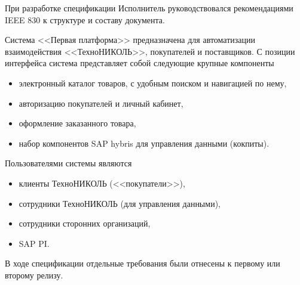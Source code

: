 

%



При разработке спецификации Исполнитель руководствовался рекомендациями IEEE 830 к структуре и составу документа.


Система <<Первая платформа>> предназначена для автоматизации взаимодействия <<ТехноНИКОЛЬ>>, покупателей и поставщиков. С позиции интерфейса система представляет собой следующие крупные компоненты 
\begin{itemize}
\item электронный каталог товаров, с удобным поиском и навигацией по нему,
\item авторизацию покупателей и личный кабинет,
\item оформление заказанного товара,
\item набор компонентов SAP hybris для управления данными (кокпиты).
\end{itemize}


Пользователями системы являются 
\begin{itemize}
\item клиенты ТехноНИКОЛЬ (<<покупатели>>), 
\item сотрудники ТехноНИКОЛЬ (для управления данными),
\item сотрудники сторонних организаций,
\item SAP PI.
\end{itemize}


В ходе спецификации отдельные требования были отнесены к первому или второму релизу. 